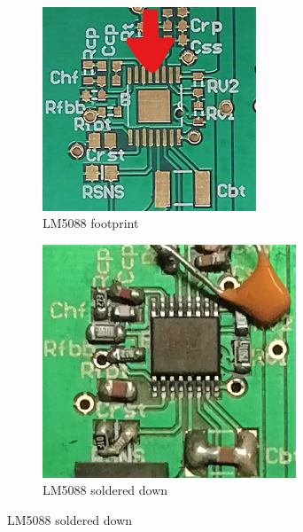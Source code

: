 \begin{enumerate}
    \begin{figure}[H]
      \centering
      \begin{minipage}[b]{0.5\textwidth}
        \begin{figure}[H]
            \centering
            \includegraphics[width=0.7\textwidth]{footprint_buck.jpg}
            \caption{LM5088 footprint}
        \end{figure}
      \end{minipage}
      \hfill
      \begin{minipage}[b]{0.45\textwidth}
        \begin{figure}[H]
            \centering
            \includegraphics[width=0.83\textwidth]{Solder_buck.jpg}
            \vspace{-3mm}
            \caption{LM5088 soldered down}
        \end{figure}
      \end{minipage}
    \end{figure}
\end{enumerate}


